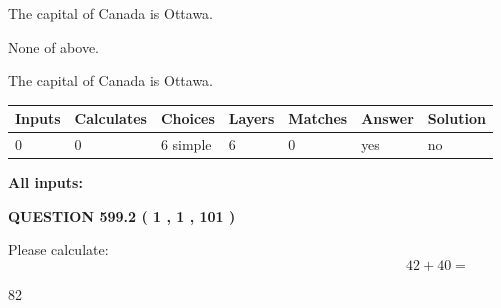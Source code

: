 \documentclass[12pt]{article}
\begin{document}
 
The capital of Canada is Ottawa.
 
 
 None of above.
 
 
\noindent{}
 
 
The capital of Canada is Ottawa.
 
 
\noindent{}
 
 
   
   
   
   
\noindent\begin{tabular}{|l|l|l|l|l|l|l|}
 \hline
Inputs & Calculates & Choices & Layers & Matches & Answer & Solution \\ \hline
 0  & 
 0  & 
 6
  simple  
  & 
 6  & 
 0  & 
  yes & 
  no 
  \\ \hline
 \end{tabular}
   
   
   
   
\noindent{}
   
   
   
   
\noindent\vspace{0.1in}\hspace{-0.08in} {\textbf{\Large{All inputs: }}}
   
   
  
\vspace{0.2in}
  
{\textbf{\Large{QUESTION
599.2 
 ( 1 , 1 , 101 )
}}}
  
  
 
Please calculate:
\begin{equation}
42 +  %
40 = \nonumber
\end{equation}
 
 
 
\noindent{}
 
 

82
 
 
\noindent{}
 
 

 
 
 
\noindent{}
 
\end{document}
